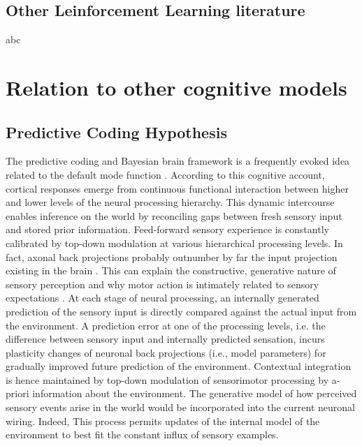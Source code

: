 \documentclass{article} %
\begin{document}
\subsection{Other Leinforcement Learning literature}
abc

\section{Relation to other cognitive models}
\subsection{Predictive Coding Hypothesis}
The predictive coding and Bayesian brain framework
is a frequently evoked idea related to the default mode function
\citep{bar2007}.
According to this cognitive account,
cortical responses emerge from continuous functional interaction between
higher and lower levels of the neural processing hierarchy.
This dynamic intercourse enables inference on the world by reconciling
gaps between fresh sensory input and stored prior information.
Feed-forward sensory experience is constantly calibrated by
top-down modulation at various hierarchical processing levels.
In fact, axonal
back projections probably outnumber by far the input projection
existing in the brain \citep{salin1995corticocortical}.
This can explain the constructive, generative nature of sensory perception
\citep{friston2010free} and
why motor action is intimately related to sensory expectations
\citep{wolpert1995internal, kording2004bayesian}.
At each stage of neural processing,
an internally generated prediction of the sensory input is
directly compared against the actual input from the environment.
A prediction error at one of the processing levels,
i.e. the difference between sensory input
and internally predicted sensation,
incurs plasticity changes of neuronal back projections (i.e., model parameters)
for gradually improved future prediction of the environment.
Contextual integration is hence maintained by top-down modulation of sensorimotor
processing by a-priori information about the environment.
The generative model of how perceived sensory events arise in the
world would be incorporated into
the current neuronal wiring.
Indeed,
This process permits updates of the internal model of the environment
to best fit the constant influx of sensory examples.
\end{document}
